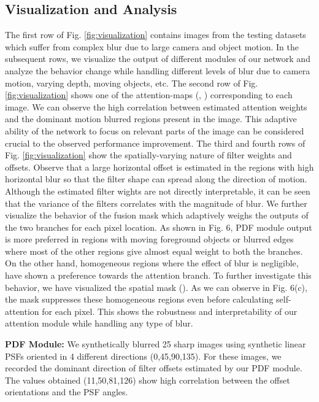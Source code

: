 \documentclass[10pt,twocolumn,letterpaper]{article}
\begin{document}
\subsection{Visualization and Analysis}
The first row of Fig. \ref{fig:visualization} contains images from the testing datasets which suffer from complex blur due to large camera and object motion. In the subsequent rows, we visualize the output of different modules of our network and analyze the behavior change while handling different levels of blur due to camera motion, varying depth, moving objects, etc. The second row of Fig. \ref{fig:visualization} shows one of the attention-maps (, ) corresponding to each image. We can observe the high correlation between estimated attention weights and the dominant motion blurred regions present in the image. This adaptive ability of the network to focus on relevant parts of the image can be considered crucial to the observed performance improvement. The third and fourth rows of Fig. \ref{fig:visualization} show the spatially-varying nature of filter weights and offsets. Observe that a large horizontal offset is estimated in the regions with high horizontal blur so that the filter shape can spread along the direction of motion. Although the estimated filter wights are not directly interpretable, it can be seen that the variance of the filters correlates with the magnitude of blur. We further visualize the behavior of the fusion mask which adaptively weighs the outputs of the two branches for each pixel location. As shown in Fig. 6, PDF module output is more preferred in regions with moving foreground objects or blurred edges where most of the other regions give almost equal weight to both the branches. On the other hand, homogeneous regions where the effect of blur is negligible, have shown a preference towards the attention branch. To further investigate this behavior, we have visualized the spatial mask (). As we can observe in Fig. 6(c), the mask suppresses these homogeneous regions even before calculating self-attention for each pixel. This shows the robustness and interpretability of our attention module while handling any type of blur.

\noindent \textbf{PDF Module:} We synthetically blurred 25 sharp images using synthetic linear PSFs oriented in 4 different directions (0,45,90,135). For these images, we recorded the dominant direction of filter offsets estimated by our PDF module. The values obtained (11,50,81,126) show high correlation between the offset orientations and the PSF angles.
\end{document}
